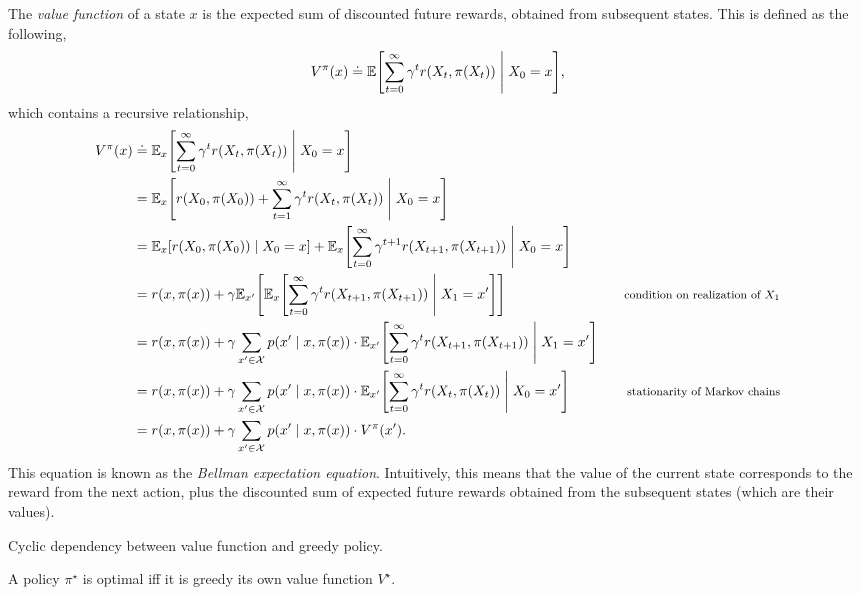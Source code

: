 The \textit{value function} of a state $x$ is the expected sum of discounted
future rewards, obtained from subsequent states. This is defined as the
following, \[
  V^\pi(x) \doteq \E \lft[ \sum_{t=0}^\infty \gamma^t r(X_t,\pi(X_t)) \;\middle|\; X_0=x \rgt]
,\]
which contains a recursive relationship,
\begin{align*}
  V^\pi(x) &\doteq \E_x \lft[ \sum_{t=0}^\infty \gamma^t r(X_t, \pi(X_t)) \;\middle|\; X_0=x \rgt] \\
  &= \E_x \lft[ r(X_0, \pi(X_0)) + \sum_{t=1}^\infty \gamma^t r(X_t, \pi(X_t)) \;\middle|\; X_0=x \rgt] \\
  &= \E_x \lft[ r(X_0, \pi(X_0)) \;\middle|\; X_0=x \rgt] + \E_x \lft[ \sum_{t=0}^\infty \gamma^{t+1} r(X_{t+1}, \pi(X_{t+1})) \;\middle|\; X_0=x \rgt] \\
  &= r(x, \pi(x)) + \gamma \E_{x'} \lft[ \E_x \lft[ \sum_{t=0}^\infty \gamma^t r(X_{t+1}, \pi(X_{t+1})) \;\middle|\; X_1=x' \rgt] \rgt] & \text{\footnotesize condition on realization of $X_1$} \\
  &= r(x, \pi(x)) + \gamma \sum_{x'\in\mathcal{X}} p(x'\mid x,\pi(x)) \cdot \E_{x'} \lft[ \sum_{t=0}^\infty \gamma^t r(X_{t+1}, \pi(X_{t+1})) \;\middle|\; X_1=x' \rgt] \\
  &= r(x, \pi(x)) + \gamma \sum_{x'\in\mathcal{X}} p(x'\mid x,\pi(x)) \cdot \E_{x'} \lft[ \sum_{t=0}^\infty \gamma^t r(X_t, \pi(X_t)) \;\middle|\; X_0=x' \rgt] & \text{\footnotesize stationarity of Markov chains} \\
  &= r(x, \pi(x)) + \gamma \sum_{x'\in\mathcal{X}} p(x'\mid x,\pi(x)) \cdot V^\pi(x')
.\end{align*}
This equation is known as the \textit{Bellman expectation equation}.
Intuitively, this means that the value of the current state corresponds to the
reward from the next action, plus the discounted sum of expected future rewards
obtained from the subsequent states (which are their values).

\begin{marginfigure}
    \centering
    \caption{Cyclic dependency between value function and greedy policy.}
    \label{fig:cyclic-dependency}
\end{marginfigure}

\begin{theorem} \label{thm:bellman}
  A policy $\pi^\star$ is optimal iff it is greedy \wrt its own value function
  $V^\star$.
\end{theorem}

